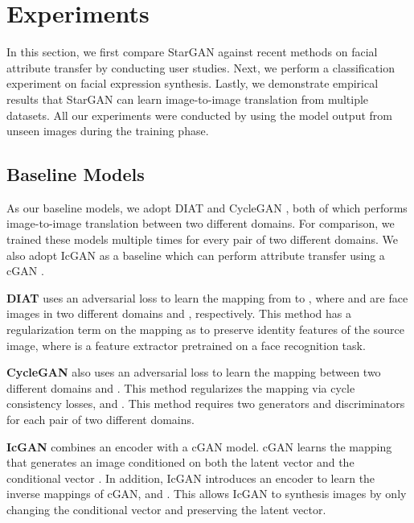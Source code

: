\documentclass[10pt,twocolumn,letterpaper]{article}
\begin{document}
\section{Experiments} \label{experiments}

In this section, we first compare StarGAN against recent methods on facial attribute transfer by conducting user studies. Next, we perform a classification experiment on facial expression synthesis. Lastly, we demonstrate empirical results that StarGAN can learn image-to-image translation from multiple datasets. All our experiments were conducted by using the model output from unseen images during the training phase. 


\subsection{Baseline Models}
As our baseline models, we adopt DIAT \cite{li2016deep} and CycleGAN \cite{zhu2017unpaired}, both of which performs image-to-image translation between two different domains. For comparison, we trained these models multiple times for every pair of two different domains. We also adopt IcGAN \cite{perarnau2016invertible} as a baseline which can perform attribute transfer using a cGAN \cite{odena2016conditional}. 

\medskip

\noindent \textbf{DIAT} uses an adversarial loss to learn the mapping from  to , where  and  are face images in two different domains  and , respectively. This method has a regularization term on the mapping as  to preserve identity features of the source image, where  is a feature extractor pretrained on a face recognition task. 

\medskip

\noindent \textbf{CycleGAN} also uses an adversarial loss to learn the mapping between two different domains  and . This method regularizes the mapping via cycle consistency losses,  and . This method requires two generators and discriminators for each pair of two different domains.
\medskip

\noindent \textbf{IcGAN} combines an encoder with a cGAN \cite{odena2016conditional} model. cGAN learns the mapping  that generates an image  conditioned on both the latent vector  and the conditional vector . In addition, IcGAN introduces an encoder to learn the inverse mappings of cGAN,  and . This allows IcGAN to synthesis images by only changing the conditional vector and preserving the latent vector.
\end{document}
